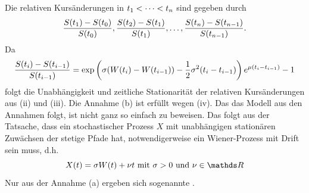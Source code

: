 \begin{itemize}
	Die relativen Kursänderungen in $t_1< \dots <t_n$ sind gegeben durch
	\[
	\frac{S(t_1)-S(t_0)}{S(t_0)},\frac{S(t_2)-S(t_1)}{S(t_1)}, \dots ,\frac{S(t_n)-S(t_{n-1})}{S(t_{n-1})}.
	\]
	Da
	\[
	\frac{S(t_i)-S(t_{i-1})}{S(t_{i-1})}= \exp\left( \sigma(W(t_i)-W(t_{i-1}))-\frac{1}{2}\sigma^2(t_i-t_{i-1})\right)e^{\mu(t_i-t_{i-1})}-1
	\]
	folgt die Unabhängigkeit und zeitliche Stationarität der relativen Kursänderungen aus (ii) und (iii).
	Die Annahme (b) ist erfüllt wegen (iv).
	Das das Modell aus den Annahmen folgt, ist nicht ganz so einfach zu beweisen.
	Das folgt aus der Tatsache, dass ein stochastischer Prozess $X$ mit unabhängigen stationären Zuwächsen der stetige Pfade hat, notwendigerweise ein Wiener-Prozess mit Drift sein muss, d.h.
	\[
	X(t)=\sigma W(t)+\nu t\text{ mit }\sigma>0\text{ und }\nu\in\R
	\]
	Nur aus der Annahme (a) ergeben sich sogenannte .
\end{itemize}

